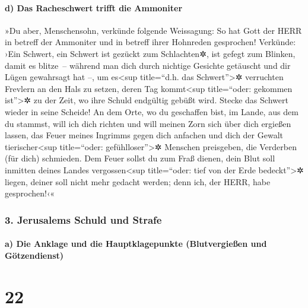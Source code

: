 \hypertarget{d-das-racheschwert-trifft-die-ammoniter}{%
\paragraph{d) Das Racheschwert trifft die
Ammoniter}\label{d-das-racheschwert-trifft-die-ammoniter}}

»Du aber, Menschensohn, verkünde folgende Weissagung: So
hat Gott der HERR in betreff der Ammoniter und in betreff ihrer
Hohnreden gesprochen! Verkünde: ›Ein Schwert, ein Schwert ist gezückt
zum Schlachten✲, ist gefegt zum Blinken, damit es blitze~--
während man dich durch nichtige Gesichte getäuscht und
dir Lügen gewahrsagt hat --, um es\textless sup title=``d.h. das
Schwert''\textgreater✲ verruchten Frevlern an den Hals zu setzen, deren
Tag kommt\textless sup title=``oder: gekommen ist''\textgreater✲ zu der
Zeit, wo ihre Schuld endgültig gebüßt wird. Stecke das
Schwert wieder in seine Scheide! An dem Orte, wo du geschaffen bist, im
Lande, aus dem du stammst, will ich dich richten und will
meinen Zorn sich über dich ergießen lassen, das Feuer meines Ingrimms
gegen dich anfachen und dich der Gewalt tierischer\textless sup
title=``oder: gefühlloser''\textgreater✲ Menschen preisgeben, die
Verderben (für dich) schmieden. Dem Feuer sollst du zum
Fraß dienen, dein Blut soll inmitten deines Landes
vergossen\textless sup title=``oder: tief von der Erde
bedeckt''\textgreater✲ liegen, deiner soll nicht mehr gedacht werden;
denn ich, der HERR, habe gesprochen!‹«

\hypertarget{jerusalems-schuld-und-strafe}{%
\subsubsection{3. Jerusalems Schuld und
Strafe}\label{jerusalems-schuld-und-strafe}}

\hypertarget{a-die-anklage-und-die-hauptklagepunkte-blutvergieuxdfen-und-guxf6tzendienst}{%
\paragraph{a) Die Anklage und die Hauptklagepunkte (Blutvergießen und
Götzendienst)}\label{a-die-anklage-und-die-hauptklagepunkte-blutvergieuxdfen-und-guxf6tzendienst}}

\hypertarget{section-21}{%
\section{22}\label{section-21}}


